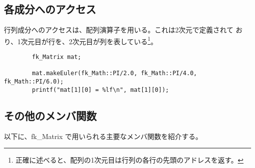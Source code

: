 \subsection{各成分へのアクセス}
行列成分へのアクセスは、配列演算子を用いる。これは2次元で定義されて
おり、1次元目が行を、2次元目が列を表している\footnote{
正確に述べると、配列の1次元目は行列の各行の先頭のアドレスを返す。}。
\\
\begin{screen}
\begin{verbatim}
        fk_Matrix mat;

        mat.makeEuler(fk_Math::PI/2.0, fk_Math::PI/4.0, fk_Math::PI/6.0);
        printf("mat[1][0] = %lf\n", mat[1][0]);
\end{verbatim}
\end{screen}
\subsection{その他のメンバ関数}
以下に、fk\_Matrix で用いられる主要なメンバ関数を紹介する。

